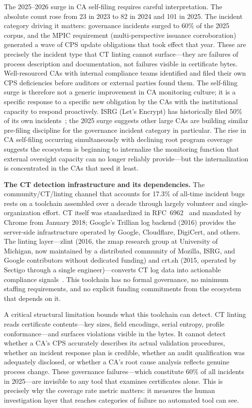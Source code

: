 \documentclass[10pt,twocolumn,letterpaper]{article}
\begin{document}
The 2025--2026 surge in CA self-filing requires careful interpretation.
The absolute count rose from 23 in 2023 to 82 in 2024 and 101 in
2025. The incident category driving it matters: governance incidents
surged to 60\% of the 2025 corpus, and the MPIC requirement
(multi-perspective issuance corroboration) generated a wave of CPS
update obligations that took effect that year. These are precisely the
incident type that CT linting cannot surface---they are failures of
process description and documentation, not failures visible in
certificate bytes. Well-resourced CAs with internal compliance teams
identified and filed their own CPS deficiencies before auditors or
external parties found them. The self-filing surge is therefore not a
generic improvement in CA monitoring culture; it is a specific response
to a specific new obligation by the CAs with the institutional capacity
to respond proactively. ISRG (Let's Encrypt) has historically filed
50\% of its own incidents~\cite{aas2019}; the 2025 surge suggests
other large CAs are building similar pre-filing discipline for the
governance incident category in particular. The rise in CA self-filing
occurring simultaneously with declining root program coverage suggests
the ecosystem is beginning to internalize the monitoring function that
external oversight capacity can no longer reliably provide---but the
internalization is concentrated in the CAs that need it least.

\textbf{The CT detection infrastructure and its dependencies.}
The community/CT/linting channel that accounts for 17.3\% of all-time
incident bugs rests on a toolchain assembled over a decade through
largely volunteer and single-organization effort. CT itself was
standardized in RFC~6962~\cite{laurie2014} and mandated by Chrome from
January 2018; Google's Trillian log backend (2016) provides the
server-side infrastructure operated by Google, Cloudflare, DigiCert,
and others. The linting layer---zlint (2016, the zmap research group
at University of Michigan, now maintained by a distributed community
of Mozilla, ISRG, and Google contributors without dedicated funding)
and crt.sh (2015, operated by Sectigo through a single
engineer)---converts CT log data into actionable compliance
signals~\cite{sun2024}. This toolchain has no formal governance, no
minimum staffing requirements, and no explicit funding commitments
from the ecosystem that depends on it.

A critical structural limitation bounds what this toolchain can detect.
CT linting reads certificate contents---key sizes, field encodings,
serial entropy, profile conformance---and surfaces violations visible
in the bytes. It cannot detect whether a CA's CPS accurately describes
its actual validation procedures, whether an incident response plan is
credible, whether an audit qualification was adequately disclosed, or
whether a CA's root cause analysis reflects genuine process change.
These governance failures---which constitute 60\% of all incidents in
2025---are invisible to any tool that examines certificates alone.
This is precisely why the coverage rate metric matters: it measures
the human investigation layer that reaches categories of failure no
automated tool can see.
\end{document}
